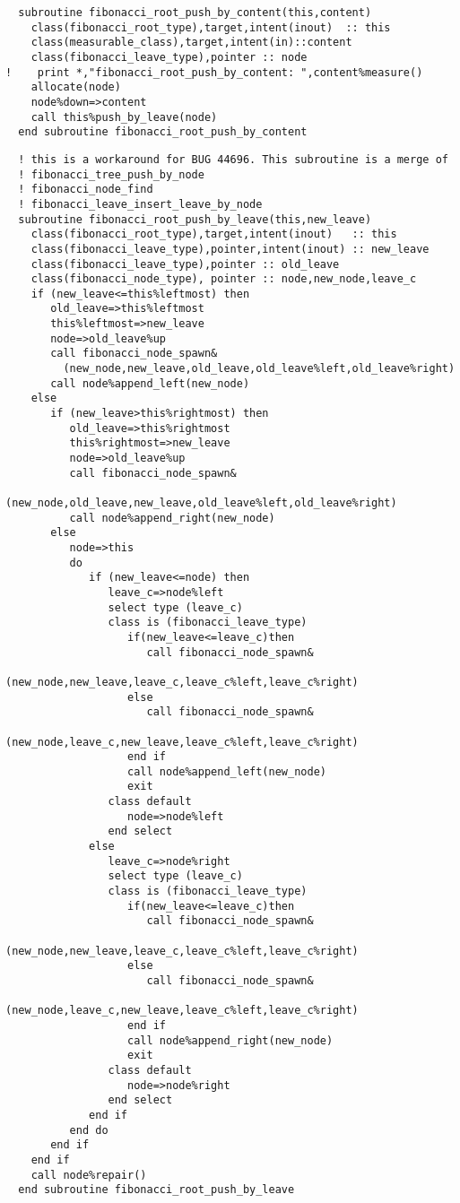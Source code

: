 \begin{Verbatim}
  subroutine fibonacci_root_push_by_content(this,content)
    class(fibonacci_root_type),target,intent(inout)  :: this
    class(measurable_class),target,intent(in)::content
    class(fibonacci_leave_type),pointer :: node
!    print *,"fibonacci_root_push_by_content: ",content%measure()
    allocate(node)
    node%down=>content
    call this%push_by_leave(node)
  end subroutine fibonacci_root_push_by_content
\end{Verbatim}
  
\begin{Verbatim}
  ! this is a workaround for BUG 44696. This subroutine is a merge of 
  ! fibonacci_tree_push_by_node
  ! fibonacci_node_find
  ! fibonacci_leave_insert_leave_by_node
  subroutine fibonacci_root_push_by_leave(this,new_leave)
    class(fibonacci_root_type),target,intent(inout)   :: this
    class(fibonacci_leave_type),pointer,intent(inout) :: new_leave
    class(fibonacci_leave_type),pointer :: old_leave
    class(fibonacci_node_type), pointer :: node,new_node,leave_c
    if (new_leave<=this%leftmost) then
       old_leave=>this%leftmost
       this%leftmost=>new_leave
       node=>old_leave%up
       call fibonacci_node_spawn&
         (new_node,new_leave,old_leave,old_leave%left,old_leave%right)
       call node%append_left(new_node)
    else
       if (new_leave>this%rightmost) then
          old_leave=>this%rightmost
          this%rightmost=>new_leave
          node=>old_leave%up
          call fibonacci_node_spawn&
            (new_node,old_leave,new_leave,old_leave%left,old_leave%right)
          call node%append_right(new_node)
       else
          node=>this
          do
             if (new_leave<=node) then
                leave_c=>node%left
                select type (leave_c)
                class is (fibonacci_leave_type)
                   if(new_leave<=leave_c)then
                      call fibonacci_node_spawn&
                        (new_node,new_leave,leave_c,leave_c%left,leave_c%right)
                   else
                      call fibonacci_node_spawn&
                        (new_node,leave_c,new_leave,leave_c%left,leave_c%right)
                   end if
                   call node%append_left(new_node)
                   exit
                class default
                   node=>node%left
                end select
             else
                leave_c=>node%right
                select type (leave_c)
                class is (fibonacci_leave_type)          
                   if(new_leave<=leave_c)then
                      call fibonacci_node_spawn&
                        (new_node,new_leave,leave_c,leave_c%left,leave_c%right)
                   else
                      call fibonacci_node_spawn&
                        (new_node,leave_c,new_leave,leave_c%left,leave_c%right)
                   end if
                   call node%append_right(new_node)
                   exit
                class default
                   node=>node%right
                end select
             end if
          end do
       end if
    end if
    call node%repair()
  end subroutine fibonacci_root_push_by_leave
\end{Verbatim}

